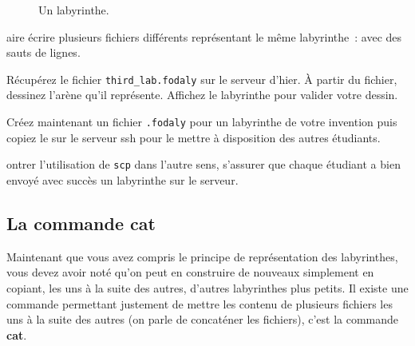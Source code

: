 \documentclass[a4paper]{article}
\newenvironment{enseignants}[1]{\noindent\color{blue}{\bf #1}}{}
\begin{document}
\begin{figure}[htbp]
  \centering
  \caption{Un labyrinthe.}\label{fig:alab}
\end{figure}

\begin{enseignants}
  Faire écrire plusieurs fichiers différents représentant le même labyrinthe~: avec des sauts de lignes.
\end{enseignants}

Récupérez le fichier \verb|third_lab.fodaly| sur le serveur d'hier.
À partir du fichier, dessinez l'arène qu'il représente.
Affichez le labyrinthe pour valider votre dessin.

Créez maintenant un fichier \verb|.fodaly| pour un labyrinthe de votre invention puis copiez le sur le serveur ssh pour le mettre à disposition des autres étudiants.

\begin{enseignants}
  Montrer l'utilisation de \verb|scp| dans l'autre sens, s'assurer que chaque étudiant a bien envoyé avec succès un labyrinthe sur le serveur.
\end{enseignants}


\subsection{La commande cat}

Maintenant que vous avez compris le principe de représentation des labyrinthes, vous devez avoir noté qu'on peut en construire de nouveaux simplement en copiant, les uns à la suite des autres, d'autres labyrinthes plus petits. Il existe une commande permettant justement de mettre les contenu de plusieurs fichiers les uns à la suite des autres (on parle de concaténer les fichiers), c'est la commande \textbf{cat}.
\end{document}
